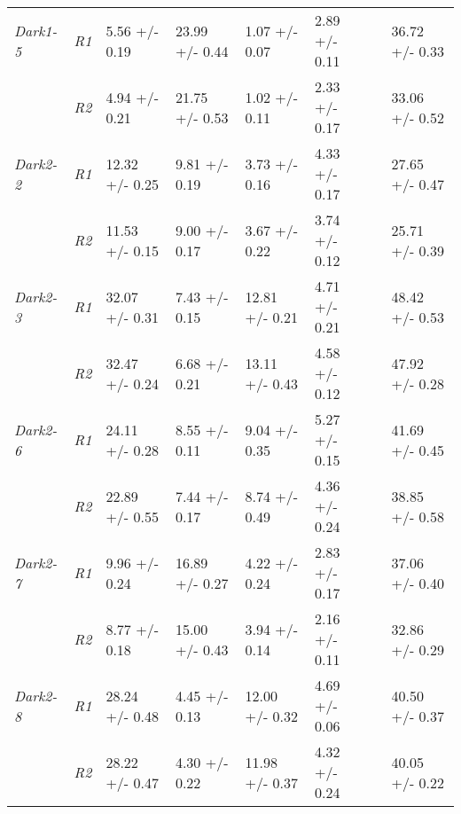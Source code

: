 \begin{table}[h]
\begin{tabular}{@{}|l|l|l|l|l|l|l|l|@{}}
         \textit{Dark1-5}     & \textit{R1}          & 5.56 +/- 0.19      & 23.99 +/- 0.44    & 1.07 +/- 0.07      & 2.89 +/- 0.11          &  & 36.72 +/- 0.33      \\ \cmidrule(lr){2-2}
                              & \textit{R2}          & 4.94 +/- 0.21      & 21.75 +/- 0.53    & 1.02 +/- 0.11      & 2.33 +/- 0.17          &  & 33.06 +/- 0.52      \\ \cmidrule(r){1-6} \cmidrule(l){8-8} 
         \textit{Dark2-2}     & \textit{R1}          & 12.32 +/- 0.25     & 9.81 +/- 0.19     & 3.73 +/- 0.16      & 4.33 +/- 0.17          &  & 27.65 +/- 0.47      \\ \cmidrule(lr){2-2}
                              & \textit{R2}          & 11.53 +/- 0.15     & 9.00 +/- 0.17     & 3.67 +/- 0.22      & 3.74 +/- 0.12          &  & 25.71 +/- 0.39      \\ \cmidrule(r){1-6} \cmidrule(l){8-8} 
         \textit{Dark2-3}     & \textit{R1}          & 32.07 +/- 0.31     & 7.43 +/- 0.15     & 12.81 +/- 0.21     & 4.71 +/- 0.21          &  & 48.42 +/- 0.53      \\ \cmidrule(lr){2-2}
                              & \textit{R2}          & 32.47 +/- 0.24     & 6.68 +/- 0.21     & 13.11 +/- 0.43     & 4.58 +/- 0.12          &  & 47.92 +/- 0.28      \\ \cmidrule(r){1-6} \cmidrule(l){8-8} 
         \textit{Dark2-6}     & \textit{R1}          & 24.11 +/- 0.28     & 8.55 +/- 0.11     & 9.04 +/- 0.35      & 5.27 +/- 0.15          &  & 41.69 +/- 0.45      \\ \cmidrule(lr){2-2}
                              & \textit{R2}          & 22.89 +/- 0.55     & 7.44 +/- 0.17     & 8.74 +/- 0.49      & 4.36 +/- 0.24          &  & 38.85 +/- 0.58      \\ \cmidrule(r){1-6} \cmidrule(l){8-8} 
         \textit{Dark2-7}     & \textit{R1}          & 9.96 +/- 0.24      & 16.89 +/- 0.27    & 4.22 +/- 0.24      & 2.83 +/- 0.17          &  & 37.06 +/- 0.40      \\ \cmidrule(lr){2-2}
                              & \textit{R2}          & 8.77 +/- 0.18      & 15.00 +/- 0.43    & 3.94 +/- 0.14      & 2.16 +/- 0.11          &  & 32.86 +/- 0.29      \\ \cmidrule(r){1-6} \cmidrule(l){8-8} 
         \textit{Dark2-8}     & \textit{R1}          & 28.24 +/- 0.48     & 4.45 +/- 0.13     & 12.00 +/- 0.32     & 4.69 +/- 0.06          &  & 40.50 +/- 0.37      \\ \cmidrule(lr){2-2}
                              & \textit{R2}          & 28.22 +/- 0.47     & 4.30 +/- 0.22     & 11.98 +/- 0.37     & 4.32 +/- 0.24          &  & 40.05 +/- 0.22      \\ \cmidrule(r){1-6} \cmidrule(l){8-8} 
     \end{tabular}
\end{table}

